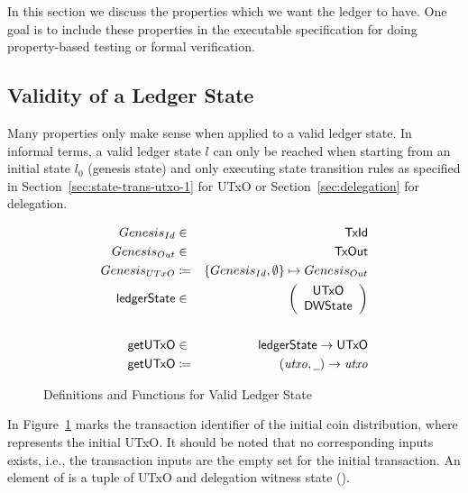 In this section we discuss the properties which we want the ledger to have. One
goal is to include these properties in the executable specification for doing
property-based testing or formal verification.

\subsection{Validity of a Ledger State}
\label{sec:valid-ledg-state}

Many properties only make sense when applied to a valid ledger state. In
informal terms, a valid ledger state $l$ can only be reached when starting from
an initial state $l_{0}$ (genesis state) and only executing state transition
rules as specified in Section~\ref{sec:state-trans-utxo-1} for UTxO or
Section~\ref{sec:delegation} for delegation.

\begin{figure}[ht]
  \centering
  \begin{align*}
    \genesisId & \in & \TxId \\
    \genesisTxOut & \in & \TxOut \\
    \genesisUTxO & \coloneqq & \{\genesisId, \emptyset\} \mapsto \genesisTxOut
    \\
    \ledgerState & \in & \left(
                         \begin{array}{c}
                           \UTxO \\
                           \DWState
                         \end{array}
    \right)\\
               && \\
    \fun{getUTxO} & \in & \ledgerState \to \UTxO \\
    \fun{getUTxO} & \coloneqq & (\var{utxo}, \wcard) \to \var{utxo}
  \end{align*}
  \caption{Definitions and Functions for Valid Ledger State}
  \label{fig:valid-ledger}
\end{figure}

In Figure~\ref{fig:valid-ledger} \genesisId{} marks the transaction identifier
of the initial coin distribution, where \genesisTxOut{} represents the initial
UTxO. It should be noted that no corresponding inputs exists, i.e., the
transaction inputs are the empty set for the initial transaction. An element of
\ledgerState{} is a tuple of UTxO and delegation witness state (\DWState).

